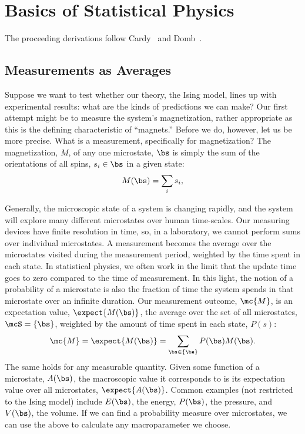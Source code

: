 \appendix
\chapter{Basics of Statistical Physics}
The proceeding derivations follow Cardy~\cite{cardy} and Domb~\cite{domb}.
\section{Measurements as Averages}\label{sec:measurements-as-averages}
Suppose we want to test whether our theory, the Ising model, lines up
with experimental results: what are the kinds of predictions we can
make? Our first attempt might be to measure the system's
magnetization, rather appropriate as this is the defining
characteristic of ``magnets.'' Before we do, however, let us be more
precise. What is a measurement, specifically for magnetization? The
magnetization, $M$, of any one microstate, $\bs$ is simply the sum of
the orientations of all spins, $s_i\in\bs$ in a given state:%
\begin{equation}%
  M(\bs)=\sum_{i} s_i,
  \label{eq:magnetization}
\end{equation}%

Generally, the microscopic state of a system is changing rapidly, and
the system will explore many different microstates over human
time-scales. Our measuring devices have finite resolution in time, so,
in a laboratory, we cannot perform sums over individual microstates. A
measurement becomes the average over the microstates visited during
the measurement period, weighted by the time spent in each state. In
statistical physics, we often work in the limit that the update time
goes to zero compared to the time of measurement. In this light, the
notion of a probability of a microstate is also the fraction of time
the system spends in that microstate over an infinite duration. Our
measurement outcome, $\mc{M}$, is an expectation value,
$\expect{M(\bs)}$, the average over the set of all microstates,
$\mcS=\{\bs\}$, weighted by the amount of time spent in each state,
$P(s)$:%
\begin{equation}%
  \mc{M}=\expect{M(\bs)}=\sum_{\bs\in\{\bs\}}P(\bs)M(\bs).
  \label{eq:magnetization-expectation}
\end{equation}%
The same holds for any measurable quantity. Given some function of a
microstate, $A(\bs)$, the macroscopic value it corresponds to is its
expectation value over all microstates, $\expect{A(\bs)}$. Common
examples (not restricted to the Ising model) include $E(\bs)$, the
energy, $P(\bs)$, the pressure, and $V(\bs)$, the volume. If we can
find a probability measure over microstates, we can use the above to
calculate any macroparameter we choose.

